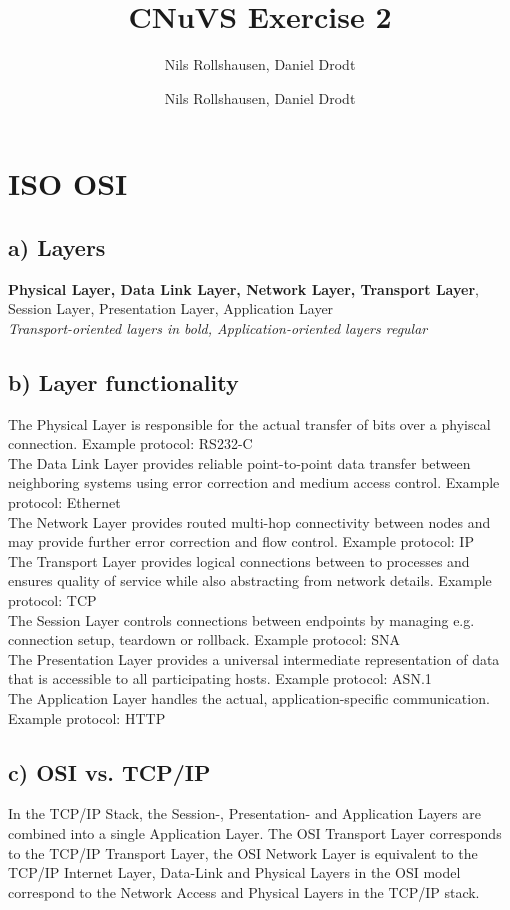 \documentclass[a4paper, 11 pt, article, accentcolor=tud7b]{tudreport}
\title{CNuVS Exercise 2}
\author{Nils Rollshausen, Daniel Drodt}
\subtitle{Nils Rollshausen, Daniel Drodt}
\begin{document}
	\maketitle
	\section{ISO OSI}
	
	\subsection*{a) Layers}
	\textbf{Physical Layer, Data Link Layer, Network Layer, Transport Layer}, Session Layer, Presentation Layer, Application Layer \\
	\textit{Transport-oriented layers in bold, Application-oriented layers regular}
	
	\subsection*{b) Layer functionality}
	The Physical Layer is responsible for the actual transfer of bits over a phyiscal connection. Example protocol: RS232-C\medskip \\
	The Data Link Layer provides reliable point-to-point data transfer between neighboring systems using error correction and medium access control. Example protocol: Ethernet \medskip \\
	The Network Layer provides routed multi-hop connectivity between nodes and may provide further error correction and flow control. Example protocol: IP \medskip \\
	The Transport Layer provides logical connections between to processes and ensures quality of service while also abstracting from network details. Example protocol: TCP \medskip \\
	The Session Layer controls connections between endpoints by managing e.g. connection setup, teardown or rollback. Example protocol: SNA\medskip \\
	The Presentation Layer provides a universal intermediate representation of data that is accessible to all participating hosts. Example protocol: ASN.1  \medskip \\
	The Application Layer handles the actual, application-specific communication. Example protocol: HTTP 
	
	\subsection*{c) OSI vs. TCP/IP}
	In the TCP/IP Stack, the Session-, Presentation- and Application Layers are combined into a single Application Layer. The OSI Transport Layer corresponds to the TCP/IP Transport Layer, the OSI Network Layer is equivalent to the TCP/IP Internet Layer, Data-Link and Physical Layers in the OSI model correspond to the Network Access and Physical Layers in the TCP/IP stack.
	
\end{document}

